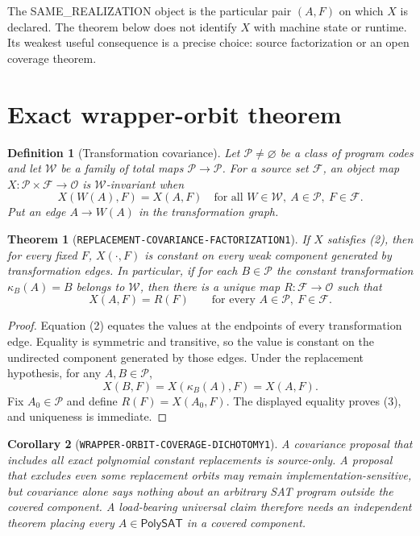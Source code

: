 \documentclass[11pt]{article}
\newtheorem{definition}{Definition}
\newtheorem{theorem}{Theorem}
\newtheorem{corollary}[theorem]{Corollary}
\newcommand{\PolySAT}{\mathsf{PolySAT}}
\begin{document}
The SAME\_REALIZATION object is the particular pair \((A,F)\) on which
\(X\) is declared. The theorem below does not identify \(X\) with machine
state or runtime. Its weakest useful consequence is a precise choice:
source factorization or an open coverage theorem.

\section{Exact wrapper-orbit theorem}
\begin{definition}[Transformation covariance]
Let \(\mathcal P\neq\varnothing\) be a class of program codes and let
\(\mathcal W\) be a family of total maps \(\mathcal P\to\mathcal P\).
For a source set \(\mathcal F\), an object map
\(X:\mathcal P\times\mathcal F\to\mathcal O\) is
\(\mathcal W\)-invariant when
\[
 X(W(A),F)=X(A,F)
 \quad\text{for all }W\in\mathcal W,\ A\in\mathcal P,\ F\in\mathcal F.
 \tag{2}
\]
Put an edge \(A\to W(A)\) in the transformation graph.
\end{definition}

\begin{theorem}[\texttt{REPLACEMENT-COVARIANCE-FACTORIZATION1}]
If \(X\) satisfies (2), then for every fixed \(F\), \(X(\cdot,F)\) is
constant on every weak component generated by transformation edges. In
particular, if for each \(B\in\mathcal P\) the constant transformation
\(\kappa_B(A)=B\) belongs to \(\mathcal W\), then there is a unique map
\(R:\mathcal F\to\mathcal O\) such that
\[
 X(A,F)=R(F)\qquad
 \text{for every }A\in\mathcal P,\ F\in\mathcal F.
 \tag{3}
\]
\end{theorem}

\begin{proof}
Equation (2) equates the values at the endpoints of every transformation
edge. Equality is symmetric and transitive, so the value is constant on the
undirected component generated by those edges. Under the replacement
hypothesis, for any \(A,B\in\mathcal P\),
\[
 X(B,F)=X(\kappa_B(A),F)=X(A,F).
\]
Fix \(A_0\in\mathcal P\) and define \(R(F)=X(A_0,F)\). The displayed equality
proves (3), and uniqueness is immediate.
\end{proof}

\begin{corollary}[\texttt{WRAPPER-ORBIT-COVERAGE-DICHOTOMY1}]
A covariance proposal that includes all exact polynomial constant
replacements is source-only. A proposal that excludes even some replacement
orbits may remain implementation-sensitive, but covariance alone says
nothing about an arbitrary SAT program outside the covered component.
A load-bearing universal claim therefore needs an independent theorem
placing every \(A\in\PolySAT\) in a covered component.
\end{corollary}
\end{document}
